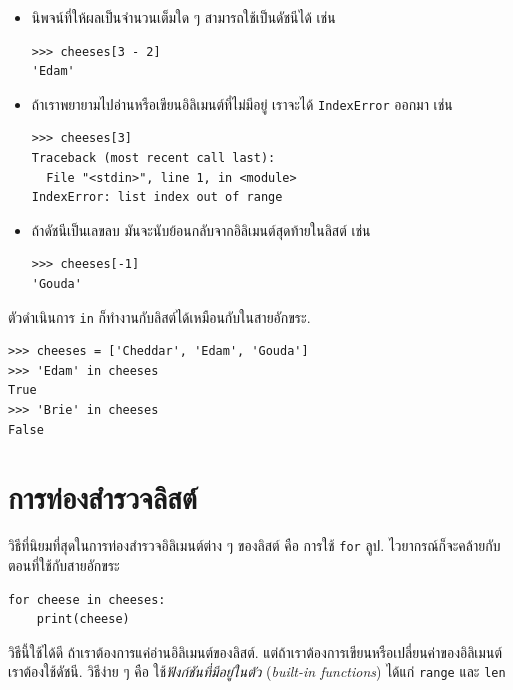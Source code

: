 \begin{itemize}

\item นิพจน์ที่ให้ผลเป็นจำนวนเต็มใด ๆ สามารถใช้เป็นดัชนีได้
เช่น
\begin{verbatim}
>>> cheeses[3 - 2]
'Edam'
\end{verbatim}

\item ถ้าเราพยายามไปอ่านหรือเขียนอิลิเมนต์ที่ไม่มีอยู่
เราจะได้ \texttt{IndexError} ออกมา เช่น
\begin{verbatim}
>>> cheeses[3]
Traceback (most recent call last):
  File "<stdin>", line 1, in <module>
IndexError: list index out of range
\end{verbatim}

\item ถ้าดัชนีเป็นเลขลบ
มันจะนับย้อนกลับจากอิลิเมนต์สุดท้ายในลิสต์ เช่น
\begin{verbatim}
>>> cheeses[-1]
'Gouda'
\end{verbatim}

\end{itemize}


ตัวดำเนินการ \texttt{in} ก็ทำงานกับลิสต์ได้เหมือนกับในสายอักขระ.

\begin{verbatim}
>>> cheeses = ['Cheddar', 'Edam', 'Gouda']
>>> 'Edam' in cheeses
True
>>> 'Brie' in cheeses
False
\end{verbatim}

\section{การท่องสำรวจลิสต์}

วิธีที่นิยมที่สุดในการท่องสำรวจอิลิเมนต์ต่าง ๆ ของลิสต์ คือ 
การใช้ \texttt{for} ลูป.
ไวยากรณ์ก็จะคล้ายกับตอนที่ใช้กับสายอักขระ

\begin{verbatim}
for cheese in cheeses:
    print(cheese)
\end{verbatim}
%
วิธีนี้ใช้ได้ดี ถ้าเราต้องการแค่อ่านอิลิเมนต์ของลิสต์.
แต่ถ้าเราต้องการเขียนหรือเปลี่ยนค่าของอิลิเมนต์
เราต้องใช้ดัชนี.
วิธีง่าย ๆ คือ ใช้\textit{ฟังก์ชันที่มีอยู่ในตัว} (\textit{built-in functions}) ได้แก่ \texttt{range} และ \texttt{len}

